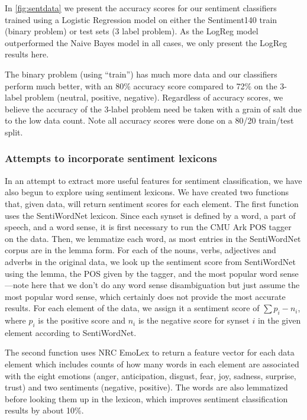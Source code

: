 \documentclass[10pt]{article}
\begin{document}
In \ref{fig:sentdata} we present the accuracy scores for our sentiment classifiers trained using a Logistic Regression model on either the Sentiment140 train (binary problem) or test sets (3 label problem). As the LogReg model outperformed the Naive Bayes model in all cases, we only present the LogReg results here.

The binary problem (using ``train'') has much more data and our classifiers perform much better, with an 80\% accuracy score compared to 72\% on the 3-label problem (neutral, positive, negative). Regardless of accuracy scores, we believe the accuracy of the 3-label problem need be taken with a grain of salt due to the low data count. Note all accuracy scores were done on a 80/20 train/test split.

\subsubsection{Attempts to incorporate sentiment lexicons}
In an attempt to extract more useful features for sentiment classification, we have also begun to explore using sentiment lexicons. We have created two functions that, given data, will return sentiment scores for each element. The first function uses the SentiWordNet lexicon. Since each synset is defined by a word, a part of speech, and a word sense, it is first necessary to run the CMU Ark POS tagger on the data. Then, we lemmatize each word, as most entries in the SentiWordNet corpus are in the lemma form. For each of the nouns, verbs, adjectives and adverbs in the original data, we look up the sentiment score from SentiWordNet using the lemma, the POS given by the tagger, and the most popular word sense—note here that we don't do any word sense disambiguation but just assume the most popular word sense, which certainly does not provide the most accurate results. For each element of the data, we assign it a sentiment score of $\sum{p_i-n_i}$, where $p_i$ is the positive score and $n_i$ is the negative score for synset $i$ in the given element according to SentiWordNet.

The second function uses NRC EmoLex to return a feature vector for each data element which includes counts of how many words in each element are associated with the eight emotions (anger, anticipation, disgust, fear, joy, sadness, surprise, trust) and two sentiments (negative, positive). The words are also lemmatized before looking them up in the lexicon, which improves sentiment classification results by about 10\%.
\end{document}
